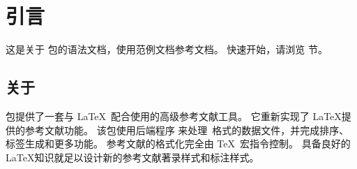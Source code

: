 

\section{引言}
\label{int}

这是关于 \biblatex 包的语法文档，使用范例文档参考文档。
快速开始，请浏览 节。



\subsection{关于 \biblatex}
\label{int:abt}



\biblatex 包提供了一套与 \LaTeX\ 配合使用的高级参考文献工具。
它重新实现了 \LaTeX 提供的参考文献功能。
该包使用后端程序 \biber 来处理\BibTeX\ 格式的数据文件，并完成排序、标签生成和更多功能。
参考文献的格式化完全由 \TeX\ 宏指令控制。
具备良好的 \LaTeX 知识就足以设计新的参考文献著录样式和标注样式。

